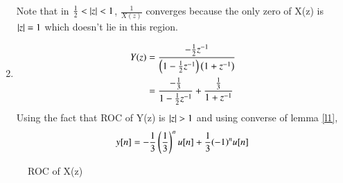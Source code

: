 \documentclass[journal,12pt,twocolumn]{IEEEtran}
\begin{document}
\begin{enumerate}[label=(\alph*)]
Note that in $\frac{1}{2} < \vert z\vert < 1$, $\frac{1}{X(z)}$ converges because the only zero of X(z) is $\vert z\vert = 1$ which doesn't lie in this region.
\item 
\begin{align}
    Y(z) &= \dfrac{-\frac{1}{2}z^{-1}}{\left(1-\frac{1}{2}z^{-1}\right)\left(1+z^{-1}\right)}\\
         &= \dfrac{-\frac{1}{3}}{1-\frac{1}{2}z^{-1}} + \dfrac{\frac{1}{3}}{1+z^{-1}}
\end{align}
Using the fact that ROC of Y(z) is $\vert z\vert > 1$ and using converse of lemma \ref{l1}, \begin{equation}
    y[n] = -\dfrac{1}{3}\left(\dfrac{1}{3}\right)^nu[n] + \dfrac{
    1}{3}(-1)^nu[n]
\end{equation} 
\end{enumerate}

\begin{figure}[h]
    \centering
    \caption{ROC of X(z)}
\end{figure}
\end{document}
